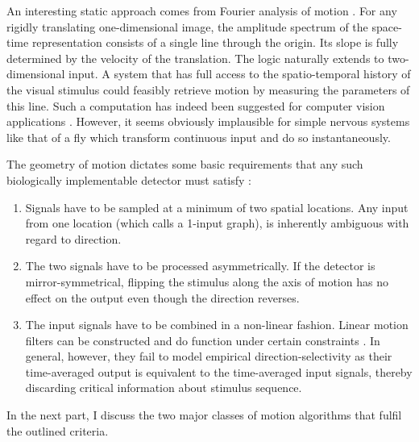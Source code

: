 An interesting static approach comes from Fourier analysis of motion \citep{vanSanten:1985ug}. For any rigidly translating one-dimensional image, the amplitude spectrum of the space-time representation consists of a single line through the origin. Its slope is fully determined by the velocity of the translation. The logic naturally extends to two-dimensional input. A system that has full access to the spatio-temporal history of the visual stimulus could feasibly retrieve motion by measuring the parameters of this line. Such a computation has indeed been suggested for computer vision applications \citep{Heeger:1987ti}. However, it seems obviously implausible for simple nervous systems like that of a fly which transform continuous input and do so instantaneously.

The geometry of motion dictates some basic requirements that any such biologically implementable detector must satisfy \citep{Borst:1989vp}:

\begin{enumerate}
    \item Signals have to be sampled at a minimum of two spatial locations. Any input from one location (which \citet{Reichardt:1987uo} calls a 1-input graph), is inherently ambiguous with regard to direction.
    \item The two signals have to be processed asymmetrically. If the detector is mirror-symmetrical, flipping the stimulus along the axis of motion has no effect on the output even though the direction reverses.
    \item The input signals have to be combined in a non-linear fashion. Linear motion filters can be constructed and do function under certain constraints \citep[see for instance][]{Watson:1985tl}. In general, however, they fail to model empirical direction-selectivity as their time-averaged output is equivalent to the time-averaged input signals, thereby discarding critical information about stimulus sequence.
\end{enumerate}

In the next part, I discuss the two major classes of motion algorithms that fulfil the outlined criteria.

